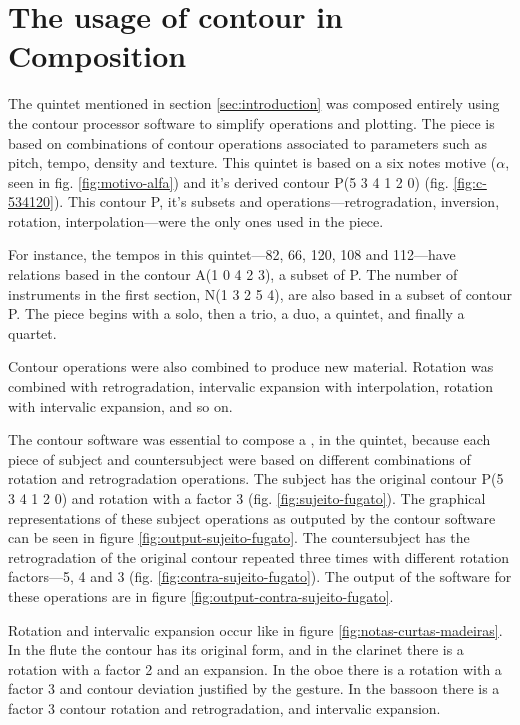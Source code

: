 \section{The usage of contour in Composition}
\label{sec:contour-composition}

The quintet mentioned in section \ref{sec:introduction} was composed
entirely using the contour processor software to simplify operations
and plotting. The piece is based on combinations of contour operations
associated to parameters such as pitch, tempo, density and texture.
This quintet is based on a six notes motive ($\alpha$, seen in fig.
\ref{fig:motivo-alfa}) and it's derived contour P(5 3 4 1 2 0) (fig.
\ref{fig:c-534120}). This contour P, it's subsets and
operations---retrogradation, inversion, rotation,
interpolation---were the only ones used in the piece.

For instance, the tempos in this quintet---82, 66, 120, 108 and
112---have relations based in the contour A(1 0 4 2 3), a subset of P.
The number of instruments in the first section, N(1 3 2 5 4), are also
based in a subset of contour P. The piece begins with a solo, then a
trio, a duo, a quintet, and finally a quartet.

Contour operations were also combined to produce new material.
Rotation was combined with retrogradation, intervalic expansion with
interpolation, rotation with intervalic expansion, and so on.

The contour software was essential to compose a , in the
quintet, because each piece of subject and countersubject were based
on different combinations of rotation and retrogradation operations.
The subject has the original contour P(5 3 4 1 2 0) and rotation with
a factor 3 (fig. \ref{fig:sujeito-fugato}). The graphical
representations of these subject operations as outputed by the contour
software can be seen in figure \ref{fig:output-sujeito-fugato}. The
countersubject has the retrogradation of the original contour repeated
three times with different rotation factors---5, 4 and 3 (fig.
\ref{fig:contra-sujeito-fugato}). The output of the software for these
operations are in figure \ref{fig:output-contra-sujeito-fugato}.

Rotation and intervalic expansion occur like in figure
\ref{fig:notas-curtas-madeiras}. In the flute the contour has its
original form, and in the clarinet there is a rotation with a factor 2
and an expansion. In the oboe there is a rotation with a factor 3 and
contour deviation justified by the gesture. In the bassoon there is a
factor 3 contour rotation and retrogradation, and intervalic
expansion.

